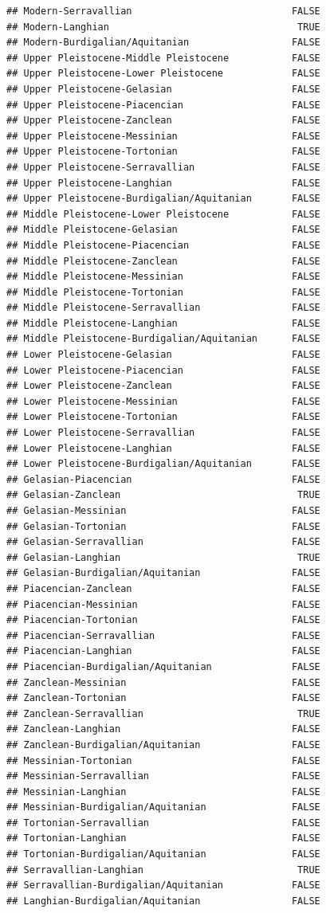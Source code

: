 \documentclass[]{article}
\begin{document}
\begin{verbatim}
## Modern-Serravallian                            FALSE
## Modern-Langhian                                 TRUE
## Modern-Burdigalian/Aquitanian                  FALSE
## Upper Pleistocene-Middle Pleistocene           FALSE
## Upper Pleistocene-Lower Pleistocene            FALSE
## Upper Pleistocene-Gelasian                     FALSE
## Upper Pleistocene-Piacencian                   FALSE
## Upper Pleistocene-Zanclean                     FALSE
## Upper Pleistocene-Messinian                    FALSE
## Upper Pleistocene-Tortonian                    FALSE
## Upper Pleistocene-Serravallian                 FALSE
## Upper Pleistocene-Langhian                     FALSE
## Upper Pleistocene-Burdigalian/Aquitanian       FALSE
## Middle Pleistocene-Lower Pleistocene           FALSE
## Middle Pleistocene-Gelasian                    FALSE
## Middle Pleistocene-Piacencian                  FALSE
## Middle Pleistocene-Zanclean                    FALSE
## Middle Pleistocene-Messinian                   FALSE
## Middle Pleistocene-Tortonian                   FALSE
## Middle Pleistocene-Serravallian                FALSE
## Middle Pleistocene-Langhian                    FALSE
## Middle Pleistocene-Burdigalian/Aquitanian      FALSE
## Lower Pleistocene-Gelasian                     FALSE
## Lower Pleistocene-Piacencian                   FALSE
## Lower Pleistocene-Zanclean                     FALSE
## Lower Pleistocene-Messinian                    FALSE
## Lower Pleistocene-Tortonian                    FALSE
## Lower Pleistocene-Serravallian                 FALSE
## Lower Pleistocene-Langhian                     FALSE
## Lower Pleistocene-Burdigalian/Aquitanian       FALSE
## Gelasian-Piacencian                            FALSE
## Gelasian-Zanclean                               TRUE
## Gelasian-Messinian                             FALSE
## Gelasian-Tortonian                             FALSE
## Gelasian-Serravallian                          FALSE
## Gelasian-Langhian                               TRUE
## Gelasian-Burdigalian/Aquitanian                FALSE
## Piacencian-Zanclean                            FALSE
## Piacencian-Messinian                           FALSE
## Piacencian-Tortonian                           FALSE
## Piacencian-Serravallian                        FALSE
## Piacencian-Langhian                            FALSE
## Piacencian-Burdigalian/Aquitanian              FALSE
## Zanclean-Messinian                             FALSE
## Zanclean-Tortonian                             FALSE
## Zanclean-Serravallian                           TRUE
## Zanclean-Langhian                              FALSE
## Zanclean-Burdigalian/Aquitanian                FALSE
## Messinian-Tortonian                            FALSE
## Messinian-Serravallian                         FALSE
## Messinian-Langhian                             FALSE
## Messinian-Burdigalian/Aquitanian               FALSE
## Tortonian-Serravallian                         FALSE
## Tortonian-Langhian                             FALSE
## Tortonian-Burdigalian/Aquitanian               FALSE
## Serravallian-Langhian                           TRUE
## Serravallian-Burdigalian/Aquitanian            FALSE
## Langhian-Burdigalian/Aquitanian                FALSE
\end{verbatim}
\end{document}
